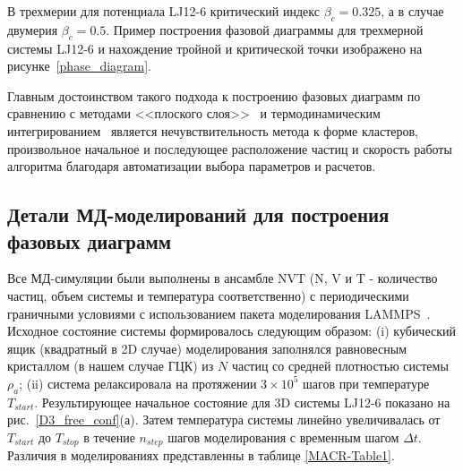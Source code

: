 В трехмерии для потенциала LJ12-6 критический индекс $\beta_c = 0.325$, а в случае двумерия $\beta_c = 0.5$.
Пример построения фазовой диаграммы для трехмерной системы LJ12-6 и нахождение тройной и критической точки изображено на рисунке~\ref{phase_diagram}.

Главным достоинством такого подхода к построению фазовых диаграмм по сравнению с методами <<плоского слоя>>~\cite{10.1021/jp806127j, 10.1021/jp1117213} и термодинамическим интегрированием~\cite{10.1088/0953-8984/21/46/465104} является нечувствительность метода к форме кластеров, произвольное начальное и последующее расположение частиц и скорость работы алгоритма благодаря автоматизации выбора параметров и расчетов.



\subsection{Детали МД-моделирований для построения фазовых диаграмм}
\label{PRIMe-SubSecPhaseDiagramMD}



Все МД-симуляции были выполнены в ансамбле NVT (N, V и T - количество частиц, объем системы и температура соответственно) с периодическими граничными условиями с использованием пакета моделирования LAMMPS~\cite{10.1006/jcph.1995.1039}.
Исходное состояние системы формировалось следующим образом: (i) кубический ящик (квадратный в 2D случае) моделирования заполнялся равновесным кристаллом (в нашем случае ГЦК) из $N$ частиц со средней плотностью системы $\rho_a$; (ii) система релаксировала на протяжении $3 \times 10^5$ шагов при температуре $T_{start}$.
Результирующее начальное состояние для 3D системы LJ12-6 показано на рис.~\ref{D3_free_conf}(а).
Затем температура системы линейно увеличивалась от $T_{start}$ до $T_{stop}$ в течение $n_{step}$ шагов моделирования с временным шагом $\Delta t$. Различия в моделированиях представленны в таблице \ref{MACR-Table1}.


